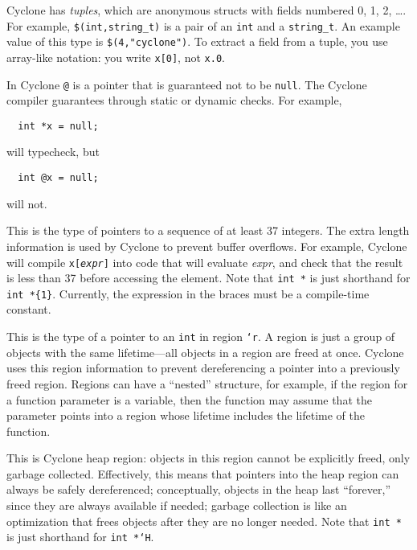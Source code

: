 
Cyclone has \emph{tuples}, which are anonymous structs with fields
numbered 0, 1, 2, \ldots.  For example, \texttt{\$(int,string_t)} is a
pair of an \texttt{int} and a \texttt{string_t}.  An example value of
this type is \texttt{\$(4,"cyclone")}.  To extract a field from a
tuple, you use array-like notation: you write \texttt{x[0]}, not
\texttt{x.0}.


In Cyclone \texttt{@} is a pointer that is guaranteed not to be
\texttt{null}.  The Cyclone compiler guarantees through static or
dynamic checks.  For example,
\begin{verbatim}
  int *x = null;
\end{verbatim}
will typecheck, but
\begin{verbatim}
  int @x = null;
\end{verbatim}
will not.


This is the type of pointers to a sequence of at least 37 integers.
The extra length information is used by Cyclone to prevent buffer
overflows.  For example, Cyclone will compile
\texttt{x[\textup{\textit{expr}}]} into code that will evaluate
\textit{expr}, and check that the result is less than 37 before
accessing the element.  Note that \texttt{int *} is just shorthand for
\verb|int *{1}|.  Currently, the expression in the braces must be a
compile-time constant.


This is the type of a pointer to an \texttt{int} in region
\texttt{`r}.  A region is just a group of objects with the same
lifetime---all objects in a region are freed at once.  Cyclone uses
this region information to prevent dereferencing a pointer into a
previously freed region.  Regions can have a ``nested'' structure, for
example, if the region for a function parameter is a variable, then
the function may assume that the parameter points into a region whose
lifetime includes the lifetime of the function.


This is Cyclone heap region: objects in this region cannot be
explicitly freed, only garbage collected.  Effectively, this means
that pointers into the heap region can always be safely dereferenced;
conceptually, objects in the heap last ``forever,'' since they are
always available if needed; garbage collection is like an optimization
that frees objects after they are no longer needed.  Note that
\texttt{int *} is just shorthand for \texttt{int *`H}.

